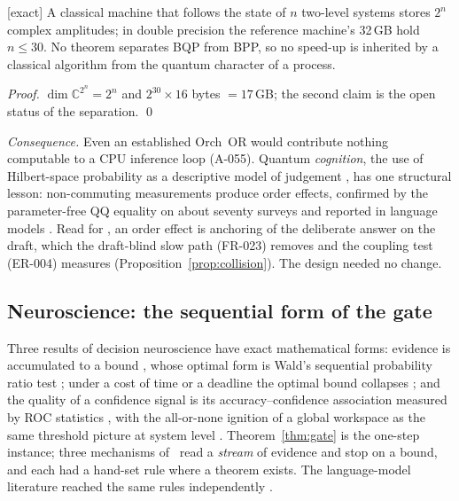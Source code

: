 \begin{proposition} \textnormal{[exact]}
\label{prop:q2}
A classical machine that follows the state of $n$ two-level systems stores $2^n$
complex amplitudes; in double precision the reference machine's 32\,GB hold
$n\le30$. No theorem separates BQP from BPP, so no speed-up is inherited by a
classical algorithm from the quantum character of a process.
\end{proposition}
\begin{proof}
$\dim\mathbb C^{2^n}=2^n$ and $2^{30}\times16$ bytes $=17$\,GB; the second claim is
the open status of the separation. \qed
\end{proof}
\emph{Consequence.} Even an established Orch~OR would contribute nothing computable to
a CPU inference loop (A-055). Quantum \emph{cognition}, the use of Hilbert-space
probability as a descriptive model of judgement
\cite{busemeyer2012quantum,pothos2013quantum}, has one structural lesson:
non-commuting measurements produce order effects, confirmed by the parameter-free
QQ equality on about seventy surveys \cite{wang2013qq,wang2014context} and
reported in language models \cite{qqllm2026}. Read for \Sys, an order effect is
anchoring of the deliberate answer on the draft, which the draft-blind slow path
(FR-023) removes and the coupling test (ER-004) measures
(Proposition~\ref{prop:collision}). The design needed no change.

\subsection{Neuroscience: the sequential form of the gate}

Three results of decision neuroscience have exact mathematical forms: evidence is
accumulated to a bound \cite{gold2007neural}, whose optimal form is Wald's
sequential probability ratio test \cite{wald1945sequential,wald1948optimum}; under
a cost of time or a deadline the optimal bound collapses
\cite{frazier2007deadline,drugowitsch2012cost}; and the quality of a confidence
signal is its accuracy--confidence association measured by ROC statistics
\cite{fleming2014metacognition}, with the all-or-none ignition of a global
workspace as the same threshold picture at system level
\cite{dehaene2011workspace}. Theorem~\ref{thm:gate} is the one-step instance;
three mechanisms of \Sys\ read a \emph{stream} of evidence and stop on a bound,
and each had a hand-set rule where a theorem exists. The language-model
literature reached the same rules independently
\cite{aggarwal2023adaptive,li2024esc,fu2025deepconf}.

